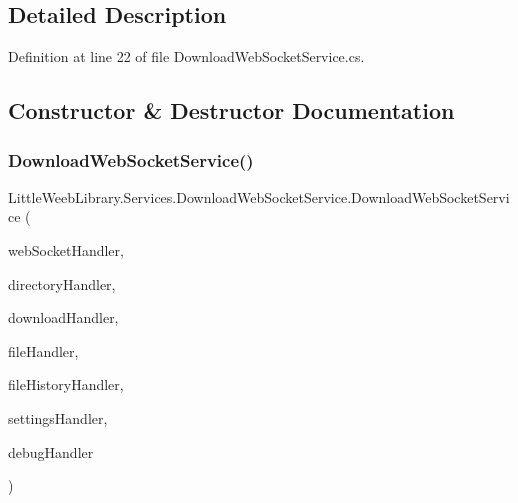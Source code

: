 \subsection{Detailed Description}


Definition at line 22 of file Download\+Web\+Socket\+Service.\+cs.



\subsection{Constructor \& Destructor Documentation}
\mbox{\label{class_little_weeb_library_1_1_services_1_1_download_web_socket_service_a33a4c5640800b885662c686013c02971}} 
\subsubsection{\texorpdfstring{Download\+Web\+Socket\+Service()}{DownloadWebSocketService()}}
{\footnotesize\ttfamily Little\+Weeb\+Library.\+Services.\+Download\+Web\+Socket\+Service.\+Download\+Web\+Socket\+Service (\begin{DoxyParamCaption}\item[{\mbox{\hyperlink{interface_little_weeb_library_1_1_handlers_1_1_i_web_socket_handler}{I\+Web\+Socket\+Handler}}}]{web\+Socket\+Handler,  }\item[{\mbox{\hyperlink{interface_little_weeb_library_1_1_handlers_1_1_i_directory_handler}{I\+Directory\+Handler}}}]{directory\+Handler,  }\item[{\mbox{\hyperlink{interface_little_weeb_library_1_1_handlers_1_1_i_download_handler}{I\+Download\+Handler}}}]{download\+Handler,  }\item[{\mbox{\hyperlink{interface_little_weeb_library_1_1_handlers_1_1_i_file_handler}{I\+File\+Handler}}}]{file\+Handler,  }\item[{\mbox{\hyperlink{interface_little_weeb_library_1_1_handlers_1_1_i_file_history_handler}{I\+File\+History\+Handler}}}]{file\+History\+Handler,  }\item[{\mbox{\hyperlink{interface_little_weeb_library_1_1_handlers_1_1_i_settings_handler}{I\+Settings\+Handler}}}]{settings\+Handler,  }\item[{\mbox{\hyperlink{interface_little_weeb_library_1_1_handlers_1_1_i_debug_handler}{I\+Debug\+Handler}}}]{debug\+Handler }\end{DoxyParamCaption})}



